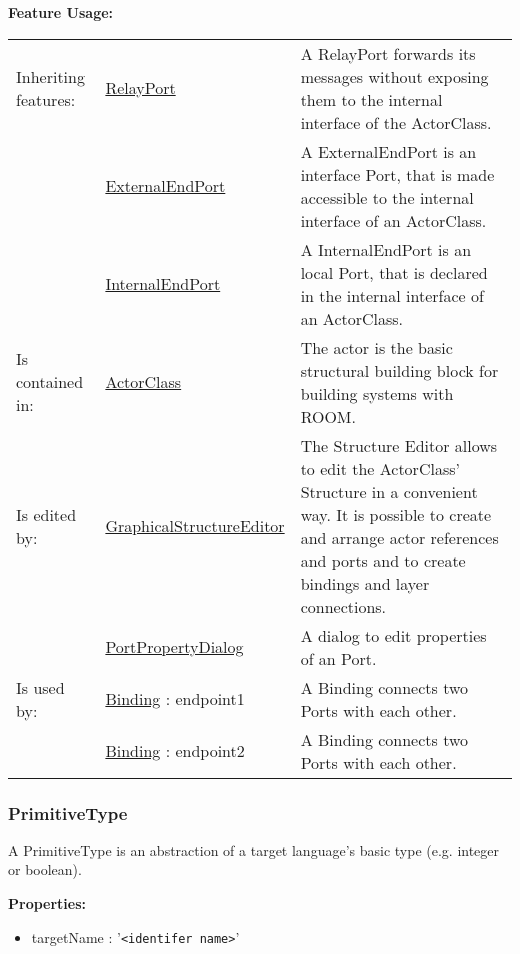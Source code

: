 	\begingroup
	\textbf{Feature Usage:}
	\renewcommand{\arraystretch}{1.8} %
	\begin{longtable}{l|l p{}}
		\hline
	Inheriting features: & \tabitem \hyperlink{ref:RelayPort}{RelayPort}  & A RelayPort forwards its messages without exposing them to the internal interface of the ActorClass.\\
	& \tabitem \hyperlink{ref:ExternalEndPort}{ExternalEndPort}  & A ExternalEndPort is an interface Port, that is made accessible to the internal interface of an ActorClass. \\
	& \tabitem \hyperlink{ref:InternalEndPort}{InternalEndPort}  & A InternalEndPort is an local Port, that is declared in the internal interface of an ActorClass. \\
	\hline
	Is contained in: & \tabitem \hyperlink{ref:ActorClass}{ActorClass}  & The actor is the basic structural building block for building systems with ROOM.\\
	\hline
	Is edited by: & \tabitem \hyperlink{ref:GraphicalStructureEditor}{GraphicalStructureEditor}  & The Structure Editor allows to edit the ActorClass' Structure in a convenient way. It is possible to create and arrange actor references and ports and to create bindings and layer connections.\\
	& \tabitem \hyperlink{ref:PortPropertyDialog}{PortPropertyDialog}  & A dialog to edit properties of an Port. \\
	\hline
	Is used by: & \tabitem \hyperlink{ref:Binding}{Binding} : endpoint1 & A Binding connects two Ports with each other.\\
	& \tabitem \hyperlink{ref:Binding}{Binding} : endpoint2 & A Binding connects two Ports with each other. \\
	\hline
	\end{longtable}
	\endgroup
		
	
	\vspace{\baselineskip}
	\vspace{\baselineskip}
	\vspace{\baselineskip}
	
\subsubsection{PrimitiveType}
	\hypertarget{ref:PrimitiveType}{}
	A PrimitiveType is an abstraction of a target language's basic type (e.g. integer or boolean).
		
		
	\textbf{Properties:}
	\begin{itemize}
	\item targetName : '\verb|<identifer name>|'
	\end{itemize}
		
